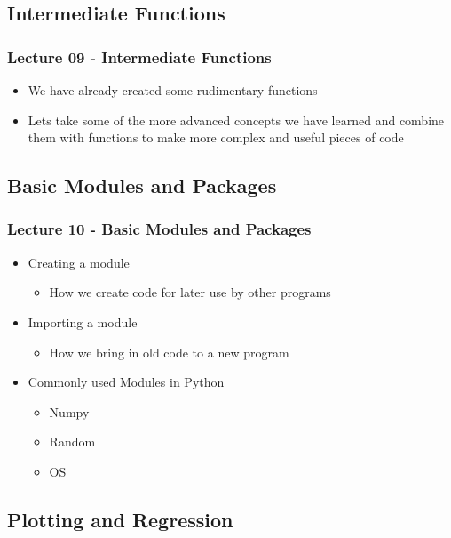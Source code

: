 \documentclass[mini frame in current subsection]{beamer}
\begin{document}
	\subsection{Intermediate Functions}
	
		\begin{frame}
			\frametitle{Lecture 09 - Intermediate Functions}
			\begin{itemize}
				\vfill\item  We have already created some rudimentary functions
				\vfill\item  Lets take some of the more advanced concepts we have learned and combine them with functions to make more complex and useful pieces of code
			\end{itemize}
		\end{frame}
		
	\subsection{Basic Modules and Packages}
	
		\begin{frame}
			\frametitle{Lecture 10 - Basic Modules and Packages}
			\begin{itemize}
				\vfill\item  Creating a module
					\begin{itemize}
						\item  How we create code for later use by other programs
					\end{itemize}
				\vfill\item  Importing a module
					\begin{itemize}
						\item  How we bring in old code to a new program
					\end{itemize}
				\vfill\item  Commonly used Modules in Python
					\begin{itemize}
						\item  Numpy
						\item  Random
						\item  OS
					\end{itemize}
			\end{itemize}
		\end{frame}
		
	\subsection{Plotting and Regression}
	
\end{document}
